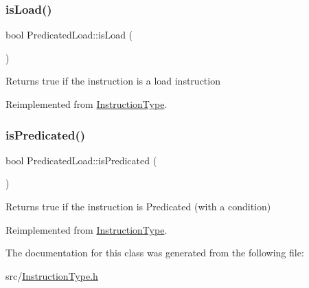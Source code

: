 \subsubsection{\texorpdfstring{is\+Load()}{isLoad()}}
{\footnotesize\ttfamily bool Predicated\+Load\+::is\+Load (\begin{DoxyParamCaption}{ }\end{DoxyParamCaption})\hspace{0.3cm}{\ttfamily [virtual]}}

Returns true if the instruction is a load instruction 

Reimplemented from \hyperlink{classInstructionType_aa3d2c042a4109b1d96dc0d7f20916ba3}{Instruction\+Type}.

\mbox{\label{classPredicatedLoad_aebf98efc7d6d09ec1d8f9c578a65e156}} 
\subsubsection{\texorpdfstring{is\+Predicated()}{isPredicated()}}
{\footnotesize\ttfamily bool Predicated\+Load\+::is\+Predicated (\begin{DoxyParamCaption}{ }\end{DoxyParamCaption})\hspace{0.3cm}{\ttfamily [virtual]}}

Returns true if the instruction is Predicated (with a condition) 

Reimplemented from \hyperlink{classInstructionType_a5b28d5b2e495222817facca7b8826975}{Instruction\+Type}.



The documentation for this class was generated from the following file\+:\begin{DoxyCompactItemize}
\item 
src/\hyperlink{InstructionType_8h}{Instruction\+Type.\+h}\end{DoxyCompactItemize}
